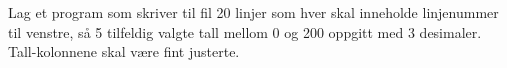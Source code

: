 %
%
Lag et program som skriver til fil 20 linjer som hver skal inneholde linjenummer til venstre, så 5 tilfeldig valgte tall mellom 0 og 200 oppgitt med 3 desimaler. Tall-kolonnene skal være fint justerte.
